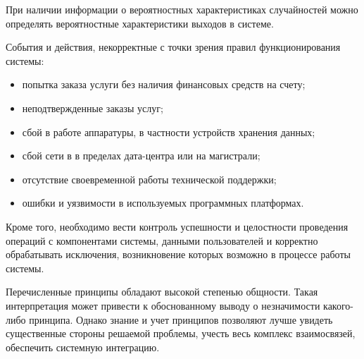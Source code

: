 При наличии информации о вероятностных характеристиках случайностей можно определять вероятностные характеристики выходов в системе.

События и действия, некорректные с точки зрения правил функционирования системы:
\begin{itemize}
  \item попытка заказа услуги без наличия финансовых средств на счету;
  \item неподтвержденные заказы услуг;
  \item сбой в работе аппаратуры, в частности устройств хранения данных;
  \item сбой сети в в пределах дата-центра или на магистрали;
  \item отсутствие своевременной работы технической поддержки;
  \item ошибки и уязвимости в используемых программных платформах.
\end{itemize}

Кроме того, необходимо вести контроль успешности и целостности проведения операций с компонентами системы, данными пользователей и корректно обрабатывать исключения, возникновение которых возможно в процессе работы системы.

Перечисленные принципы обладают высокой степенью общности.
Такая интерпретация может привести к обоснованному выводу о незначимости какого-либо принципа.
Однако знание и учет принципов позволяют лучше увидеть существенные стороны решаемой проблемы, учесть весь комплекс взаимосвязей, обеспечить системную интеграцию.

\clearpage
